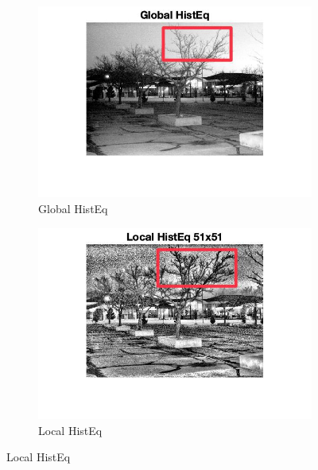 \documentclass[12pt]{article}
\begin{document}
    \begin{figure}[ht]
        \centering
        
        \begin{subfigure}[b]{0.4\textwidth}
            \centering
            \includegraphics[width=\textwidth]{../images/LC1_globalHistEq_1.jpeg}
            \caption{Global HistEq}
        \end{subfigure}
        \hfill
        \begin{subfigure}[b]{0.4\textwidth}
            \centering
            \includegraphics[width=\textwidth]{../images/LC1_localHistEq_1.jpeg}
            \caption{Local HistEq}
        \end{subfigure}
        
        \vspace{10pt} %
        

\end{figure}
\end{document}
